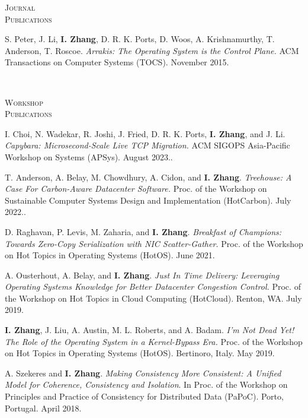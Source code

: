 \documentclass[10pt,times]{report}
\newlength{\sectiongap}
\newlength{\sectioncolwidth}
\newlength{\colgap}
\newlength{\stuffwidth}
\newenvironment{rtable}{
  \begin{minipage}{\textwidth}
  }{
  \end{minipage}
}
\newenvironment{rsection}[1]{
  \begin{minipage}[t]{\sectioncolwidth}
    \textsc{#1}
  \end{minipage}
  \hspace{\colgap}
  \begin{minipage}[t]{\stuffwidth}
  }{
    \removelastskip
  \end{minipage}
  \\[\sectiongap]
}
\begin{document}
\begin{rtable}
\begin{rsection}{Journal\\Publications}
    S. Peter, J. Li, \textbf{I. Zhang}, D. R. K. Ports, D. Woos,
    A. Krishnamurthy, T. Anderson, T. Roscoe.  \textit{Arrakis: The
      Operating System is the Control Plane.}  ACM Transactions on
    Computer Systems (TOCS). November 2015.
  \end{rsection}
  
  \begin{rsection}{Workshop\\Publications}
    I. Choi, N. Wadekar, R. Joshi, J. Fried, D. R. K. Ports,
    \textbf{I. Zhang}, and J. Li. \textit{Capybara: Microsecond-Scale
      Live TCP Migration.}  ACM SIGOPS Asia-Pacific Workshop on
    Systems (APSys). August 2023..\\\vspace{-0.5em}

    T. Anderson, A. Belay, M. Chowdhury, A. Cidon, and \textbf{I. Zhang}.
    \textit{    Treehouse: A Case For Carbon-Aware Datacenter Software.}
   Proc. of the Workshop on Sustainable Computer Systems Design and
   Implementation (HotCarbon). July 2022..\\\vspace{-0.5em}

    D. Raghavan, P. Levis, M. Zaharia, and
    \textbf{I. Zhang}. \textit{Breakfast of Champions: Towards
      Zero-Copy Serialization with NIC Scatter-Gather.}  Proc.
    of the Workshop on Hot Topics in Operating Systems (HotOS). June
    2021.\\\vspace{-0.5em}

    A. Ousterhout, A. Belay, and \textbf{I. Zhang}. \textit{Just In
      Time Delivery: Leveraging Operating Systems Knowledge for Better
      Datacenter Congestion Control.  } Proc. of the Workshop on
    Hot Topics in Cloud Computing (HotCloud). Renton, WA. July
    2019. \\\vspace{-0.5em}

    \textbf{I. Zhang}, J. Liu, A. Austin, M.  L. Roberts, and
    A. Badam.  \textit{I'm Not Dead Yet! The Role of the Operating
      System in a Kernel-Bypass Era. } Proc. of the Workshop on
    Hot Topics in Operating Systems (HotOS). Bertinoro, Italy. May
    2019.\\\vspace{-0.5em}

    A. Szekeres and \textbf{I. Zhang}. \textit{Making Consistency More
      Consistent: A Unified Model for Coherence, Consistency and
      Isolation}. In Proc. of the Workshop on Principles and
    Practice of Consistency for Distributed Data (PaPoC). Porto,
    Portugal. April 2018. \\\vspace{-0.5em}


\end{rsection}
\end{rtable}
\end{document}
